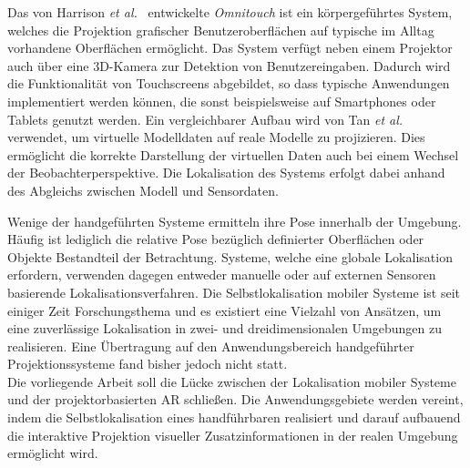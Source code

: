 Das von Harrison \textit{et al.\ }\cite{Harrison2011} entwickelte \textit{Omnitouch} ist ein körpergeführtes System, welches die Projektion grafischer Benutzeroberflächen auf typische im Alltag vorhandene Oberflächen ermöglicht. Das System verfügt neben einem Projektor auch über eine 3D-Kamera zur Detektion von Benutzereingaben. Dadurch wird die Funktionalität von Touchscreens abgebildet, so dass typische Anwendungen implementiert werden können, die sonst beispielsweise auf Smartphones oder Tablets genutzt werden. Ein vergleichbarer Aufbau wird von Tan \textit{et al.} \cite{Tan2013} verwendet, um virtuelle Modelldaten auf reale Modelle zu projizieren. Dies ermöglicht die korrekte Darstellung der virtuellen Daten auch bei einem Wechsel der Beobachterperspektive. Die Lokalisation des Systems erfolgt dabei anhand des Abgleichs zwischen Modell und Sensordaten.\\

\prever{
}

Wenige der handgeführten Systeme ermitteln ihre Pose innerhalb der Umgebung. Häufig ist lediglich die relative Pose bezüglich definierter Oberflächen oder Objekte Bestandteil der Betrachtung. Systeme, welche eine globale Lokalisation erfordern, verwenden dagegen entweder manuelle oder auf externen Sensoren basierende Lokalisationsverfahren. Die Selbstlokalisation mobiler Systeme ist seit einiger Zeit Forschungsthema und es existiert eine Vielzahl von Ansätzen, um eine zuverlässige Lokalisation in zwei- und dreidimensionalen Umgebungen zu realisieren. Eine Übertragung auf den Anwendungsbereich handgeführter Projektionssysteme fand bisher jedoch nicht statt.\\

Die vorliegende Arbeit soll die Lücke zwischen der Lokalisation mobiler Systeme und der projektorbasierten AR schließen. Die Anwendungsgebiete werden vereint, indem die Selbstlokalisation eines handführbaren  realisiert und darauf aufbauend die interaktive Projektion visueller Zusatzinformationen in der realen Umgebung ermöglicht wird.\\

\prever{
}



